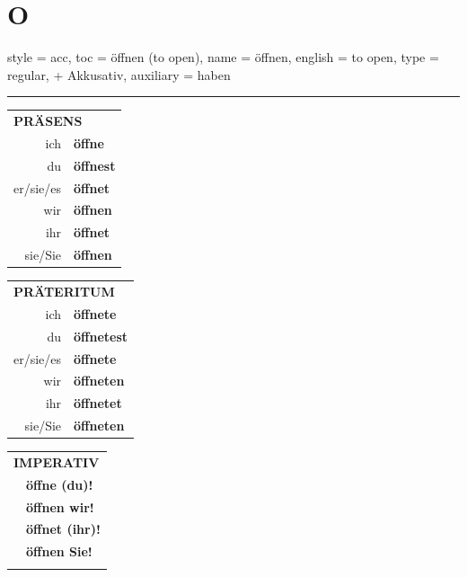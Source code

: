 \section{O}

\begin{verbentry}{
  style = {acc},
  toc = {öffnen (to open)},
  name = {öffnen},
  english = {to open},
  type = {regular, + Akkusativ},
  auxiliary = {haben}
}
 
    
     \vspace{5pt}

    \hrule
    
    \vspace{5pt}

  \begin{tabular}{rl}
     \multicolumn{2}{l}{\textbf{PRÄSENS} }\\
    ich & \textbf{öffne}\\
    du & \textbf{öffnest}\\
    er/sie/es & \textbf{öffnet}\\
    wir & \textbf{öffnen}\\
    ihr & \textbf{öffnet}\\
    sie/Sie & \textbf{öffnen}\\
  \end{tabular}
  \hfill
     \begin{tabular}{rl}
    \multicolumn{2}{l}{\textbf{PRÄTERITUM} }\\
    ich & \textbf{öffnete}\\
    du & \textbf{öffnetest}\\
    er/sie/es & \textbf{öffnete}\\
    wir & \textbf{öffneten}\\
    ihr & \textbf{öffnetet}\\
    sie/Sie & \textbf{öffneten}\\
  \end{tabular}
  \hfill
  \begin{tabular}{rl}
     \multicolumn{2}{l}{\textbf{IMPERATIV} }\\
   & \textbf{öffne (du)!}\\
   & \textbf{öffnen wir!}\\
   & \textbf{öffnet (ihr)!}\\
   & \textbf{öffnen Sie!}\\
   & \vspace{10pt}
  \end{tabular}

    \vspace{10pt}


\end{verbentry}
